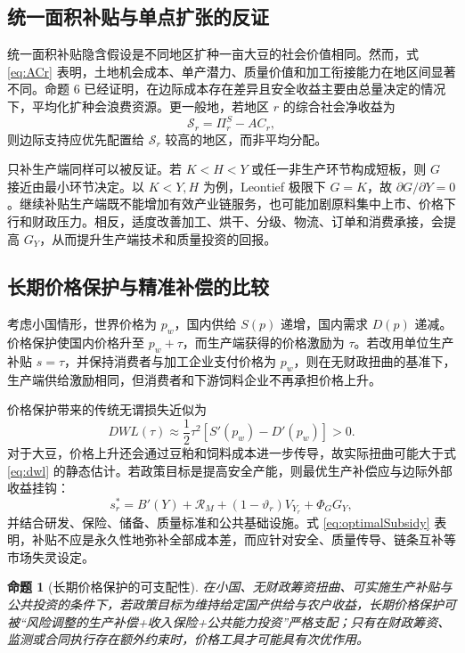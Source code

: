 \documentclass[UTF8,zihao=-4,fontset=fandol]{ctexart}
\numberwithin{equation}{section}
\newtheorem{proposition}{命题}
\theoremstyle{definition}
\theoremstyle{remark}
\begin{document}
\subsection{统一面积补贴与单点扩张的反证}

统一面积补贴隐含假设是不同地区扩种一亩大豆的社会价值相同。然而，式 \eqref{eq:ACr} 表明，土地机会成本、单产潜力、质量价值和加工衔接能力在地区间显著不同。命题 6 已经证明，在边际成本存在差异且安全收益主要由总量决定的情况下，平均化扩种会浪费资源。更一般地，若地区 $r$ 的综合社会净收益为
\begin{equation}
 \mathcal{S}_r=\Pi_r^S-AC_r,
 \label{eq:surplusregion}
\end{equation}
则边际支持应优先配置给 $\mathcal{S}_r$ 较高的地区，而非平均分配。

只补生产端同样可以被反证。若 $K<H<Y$ 或任一非生产环节构成短板，则 $G$ 接近由最小环节决定。以 $K<Y,H$ 为例，Leontief 极限下 $G=K$，故 $\partial G/\partial Y=0$。继续补贴生产端既不能增加有效产业链服务，也可能加剧原料集中上市、价格下行和财政压力。相反，适度改善加工、烘干、分级、物流、订单和消费承接，会提高 $G_Y$，从而提升生产端技术和质量投资的回报。

\subsection{长期价格保护与精准补偿的比较}

考虑小国情形，世界价格为 $p_w$，国内供给 $S(p)$ 递增，国内需求 $D(p)$ 递减。价格保护使国内价格升至 $p_w+\tau$，而生产端获得的价格激励为 $\tau$。若改用单位生产补贴 $s=\tau$，并保持消费者与加工企业支付价格为 $p_w$，则在无财政扭曲的基准下，生产端供给激励相同，但消费者和下游饲料企业不再承担价格上升。

价格保护带来的传统无谓损失近似为
\begin{equation}
 DWL(\tau)\approx\frac{1}{2}\tau^2\left[S'(p_w)-D'(p_w)\right]>0.
 \label{eq:dwl}
\end{equation}
对于大豆，价格上升还会通过豆粕和饲料成本进一步传导，故实际扭曲可能大于式 \eqref{eq:dwl} 的静态估计。若政策目标是提高安全产能，则最优生产补偿应与边际外部收益挂钩：
\begin{equation}
 s_r^*=B'(Y)+\mathcal{R}_M+(1-\vartheta_r)V_{Y_r}+\Phi_GG_Y,
 \label{eq:optimalSubsidy}
\end{equation}
并结合研发、保险、储备、质量标准和公共基础设施。式 \eqref{eq:optimalSubsidy} 表明，补贴不应是永久性地弥补全部成本差，而应针对安全、质量传导、链条互补等市场失灵设定。

\begin{proposition}[长期价格保护的可支配性]
在小国、无财政筹资扭曲、可实施生产补贴与公共投资的条件下，若政策目标为维持给定国产供给与农户收益，长期价格保护可被“风险调整的生产补偿+收入保险+公共能力投资”严格支配；只有在财政筹资、监测或合同执行存在额外约束时，价格工具才可能具有次优作用。
\end{proposition}
\end{document}
